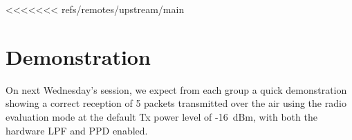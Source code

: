 <<<<<<< refs/remotes/upstream/main
\section{Demonstration}


On next Wednesday's session, we expect from each group a quick demonstration showing a correct reception of 5 packets transmitted over the air using the radio evaluation mode
at the default Tx power level of -16~dBm, with both the hardware LPF and PPD enabled.

\begin{comment}
=======
\section{Report and demonstration}

\subsection{Demonstration}

On Friday's session, we expect from each group a quick demonstration showing a correct reception of 5 packets transmitted over the air using the radio evaluation mode
at the default Tx power level of -16~dBm, with both the hardware LPF and preamble detector enabled.

>>>>>>> Revert "enlever le chain de argu"
\subsection{Report}

Please upload a report of \textbf{maximum} 2 pages with
\begin{enumerate}
    \item The output of the python testbench of the preamble detector (\texttt{3\_compare.py}), as well as your implementation of the Absolute-value norm.

    \item A summary of the resource usage (logic elements) and worst slack (setup) for the different compilation performed :
    \begin{enumerate}
        \item Initial design without register retiming and embedded multipliers.
        \item Initial design with register retiming and embedded multipliers.
        \item Final design with Absolute-value norm estimator.
    \end{enumerate}


\end{comment}
